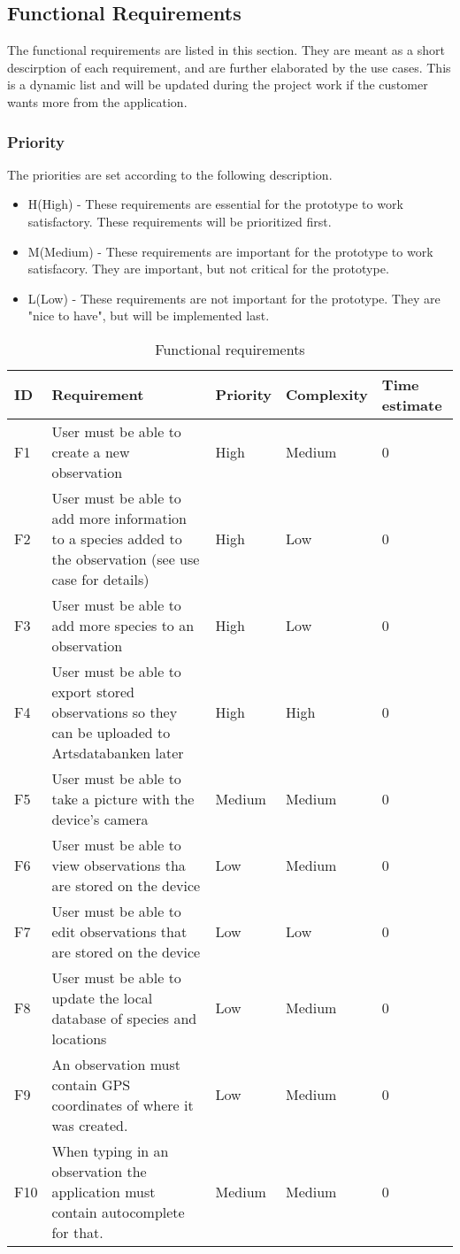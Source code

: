 \subsection{Functional Requirements}
The functional requirements are listed in this section. They are meant as a short descirption of each requirement, and are further elaborated by the use cases. This is a dynamic list and will be updated during the project work if the customer wants more from the application.

\subsubsection{Priority}
The priorities are set according to the following description.
\begin{itemize}
	 \item H(High) - These requirements are essential for the prototype to work satisfactory. These requirements will be prioritized first.
	\item M(Medium) - These requirements are important for the prototype to work satisfacory. They are important, but not critical for the prototype.
	\item L(Low) - These requirements are not important for the prototype. They are "nice to have", but will be implemented last.
\end{itemize}

\begin{table}[h!]
	\begin{tabular}[t]{|l|p{}|l|l|p{}|}\hline
	\bf ID&\bf Requirement& \bf Priority& \bf Complexity&\bf Time estimate\\\hline
	F1&User must be able to create a new observation &High&Medium&0\\\hline
	F2&User must be able to add more information to a species added to the observation (see use case for details) 	&High&Low&0\\\hline
	F3&User must be able to add more species to an observation &High&Low&0\\\hline
	F4&User must be able to export stored observations so they can be uploaded to Artsdatabanken later &High&High&0\\\hline
	F5&User must be able to take a picture with the device's camera &Medium&Medium&0\\\hline
	F6&User must be able to view observations tha are stored on the device &Low&Medium&0\\\hline
	F7&User must be able to edit observations that are stored on the device &Low&Low&0\\\hline
	F8&User must be able to update the local database of species and locations &Low&Medium&0\\\hline
	F9&An observation must contain GPS coordinates of where it was created. &Low&Medium&0\\\hline
	F10&When typing in an observation the application must contain autocomplete for that. &Medium&Medium&0\\\hline
	\end{tabular}
	\caption{Functional requirements}
	\label{funcreqs}
\end{table}

